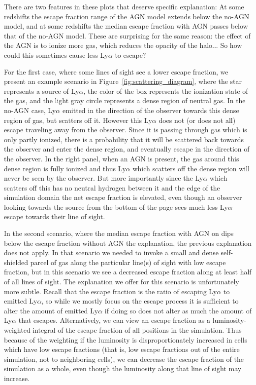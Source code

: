 There are two features in these plots that deserve specific explanation: At some redshifts the escape fraction range of the AGN model extends below the no-AGN model, and at some redshifts the median escape fraction with AGN passes below that of the no-AGN model.
These are surprising for the same reason: the effect of the AGN is to ionize more gas, which reduces the opacity of the halo... So how could this sometimes cause less Ly$\alpha$ to escape?

For the first case, where some lines of sight see a lower escape fraction, we present an example scenario in Figure~\ref{fig:scattering_diagram}, where the star represents a source of Ly$\alpha$, the color of the box represents the ionization state of the gas, and the light gray circle represents a dense region of neutral gas.
In the no-AGN case, Ly$\alpha$ emitted in the direction of the observer towards this dense region of gas, but scatters off it.
However this Ly$\alpha$ does not (or does not all) escape traveling away from the observer.
Since it is passing through gas which is only partly ionized, there is a probability that it will be scattered back towards the observer and enter the dense region, and eventually escape in the direction of the observer.
In the right panel, when an AGN is present, the gas around this dense region is fully ionized and thus Ly$\alpha$ which scatters off the dense region will never be seen by the observer.
But more importantly since the Ly$\alpha$ which scatters off this has no neutral hydrogen between it and the edge of the simulation domain the net escape fraction is elevated, even though an observer looking towards the source from the bottom of the page sees much less Ly$\alpha$ escape towards their line of sight.

In the second scenario, where the median escape fraction with AGN on dips below the escape fraction without AGN the explanation, the previous explanation does not apply.
In that scenario we needed to invoke a small and dense self-shielded parcel of gas along the particular line(s) of sight with low escape fraction, but in this scenario we see a decreased escape fraction along at least half of all lines of sight.
The explanation we offer for this scenario is unfortunately more subtle.
Recall that the escape fraction is the ratio of escaping Ly$\alpha$ to emitted Ly$\alpha$, so while we mostly focus on the escape process it is sufficient to alter the amount of emitted Ly$\alpha$ if doing so does not alter as much the amount of Ly$\alpha$ that escapes.
Alternatively, we can view an escape fraction as a luminosity-weighted integral of the escape fraction of all positions in the simulation.
Thus because of the weighting if the luminosity is disproportionately increased in cells which have low escape fractions (that is, low escape fractions out of the entire simulation, not to neighboring cells), we can decrease the escape fraction of the simulation as a whole, even though the luminosity along that line of sight may increase.

